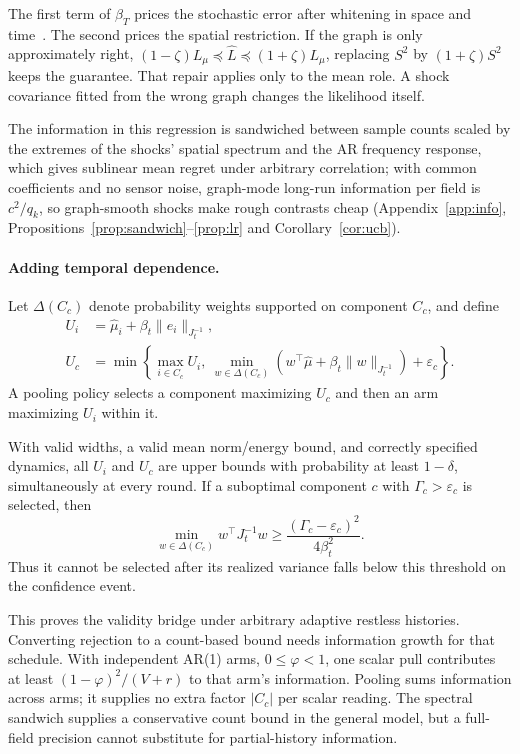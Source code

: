 \documentclass[sigconf,review,anonymous]{acmart}
\begin{document}
The first term of $\beta_T$ prices the stochastic error after whitening in space and time~\cite{abbasi2011improved}. The second prices the spatial restriction. If the graph is only approximately right, $(1-\zeta)L_\mu\preceq\hat L\preceq(1+\zeta)L_\mu$, replacing $S^2$ by $(1+\zeta)S^2$ keeps the guarantee. That repair applies only to the mean role. A shock covariance fitted from the wrong graph changes the likelihood itself.

The information in this regression is sandwiched between sample counts scaled by the extremes of the shocks' spatial spectrum and the AR frequency response, which gives sublinear mean regret under arbitrary correlation; with common coefficients and no sensor noise, graph-mode long-run information per field is $c^2/q_k$, so graph-smooth shocks make rough contrasts cheap (Appendix~\ref{app:info}, Propositions~\ref{prop:sandwich}--\ref{prop:lr} and Corollary~\ref{cor:ucb}).

\paragraph{Adding temporal dependence.} Let $\Delta(C_c)$ denote probability weights supported on component $C_c$, and define
\begin{align*}
U_i&=\hat\mu_i+\beta_t\|e_i\|_{J_t^{-1}},\\
U_c&=\min\left\{\max_{i\in C_c}U_i,\ 
\min_{w\in\Delta(C_c)}(w^\top\hat\mu+\beta_t\|w\|_{J_t^{-1}})+\varepsilon_c\right\}.
\end{align*}
A pooling policy selects a component maximizing $U_c$ and then an arm maximizing $U_i$ within it.

\begin{theorem}\label{thm:b1}
With valid widths, a valid mean norm/energy bound, and correctly specified dynamics, all $U_i$ and $U_c$ are upper bounds with probability at least $1-\delta$, simultaneously at every round. If a suboptimal component $c$ with $\Gamma_c>\varepsilon_c$ is selected, then
\[
\min_{w\in\Delta(C_c)}w^\top J_t^{-1}w
\ge\frac{(\Gamma_c-\varepsilon_c)^2}{4\beta_t^2}.
\]
Thus it cannot be selected after its realized variance falls below this threshold on the confidence event.
\end{theorem}

This proves the validity bridge under arbitrary adaptive restless histories. Converting rejection to a count-based bound needs information growth for that schedule. With independent AR(1) arms, $0\le\varphi<1$, one scalar pull contributes at least $(1-\varphi)^2/(V+r)$ to that arm's information. Pooling sums information across arms; it supplies no extra factor $|C_c|$ per scalar reading. The spectral sandwich supplies a conservative count bound in the general model, but a full-field precision cannot substitute for partial-history information.
\end{document}

